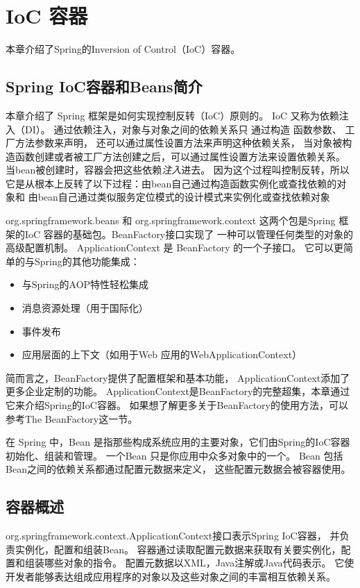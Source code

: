 
\chapter{IoC 容器}
本章介绍了Spring的Inversion of Control（IoC）容器。

\section{Spring IoC容器和Beans简介}
本章介绍了 Spring 框架是如何实现控制反转（IoC）原则的。
IoC 又称为依赖注入（DI）。
通过依赖注入，对象与对象之间的依赖关系只
通过构造
函数参数、
工厂方法参数来声明，
还可以通过属性设置方法来声明这种依赖关系，
当对象被构造函数创建或者被工厂方法创建之后，可以通过属性设置方法来设置依赖关系。
当bean被创建时，容器会把这些依赖\textit{注入}进去。
因为这个过程叫控制反转，所以它是从根本上反转了以下过程：由bean自己通过构造函数实例化或查找依赖的对象和
由bean自己通过类似服务定位模式的设计模式来实例化或查找依赖对象

org.springframework.beans 和 org.springframework.context 
这两个包是Spring 框架的IoC 容器的基础包。BeanFactory接口实现了
一种可以管理任何类型的对象的高级配置机制。
ApplicationContext 是 BeanFactory 的一个子接口。
它可以更简单的与Spring的其他功能集成：

\begin{itemize}
    \item 与Spring的AOP特性轻松集成
    \item 消息资源处理（用于国际化）
    \item 事件发布
    \item 应用层面的上下文（如用于Web 应用的WebApplicationContext）
\end{itemize}

简而言之，BeanFactory提供了配置框架和基本功能，
ApplicationContext添加了更多企业定制的功能。
ApplicationContext是BeanFactory的完整超集，本章通过它来介绍Spring的IoC容器。
如果想了解更多关于BeanFactory的使用方法，可以参考The BeanFactory这一节。

在 Spring 中，Bean 是指那些构成系统应用的主要对象，它们由Spring的IoC容器初始化、组装和管理。
一个Bean 只是你应用中众多对象中的一个。
Bean 包括 Bean之间的依赖关系都通过配置元数据来定义，
这些配置元数据会被容器使用。

\section{容器概述}
org.springframework.context.ApplicationContext接口表示Spring IoC容器，
并负责实例化，配置和组装Bean。 
容器通过读取配置元数据来获取有关要实例化，配置和组装哪些对象的指令。 
配置元数据以XML，Java注解或Java代码表示。 
它使开发者能够表达组成应用程序的对象以及这些对象之间的丰富相互依赖关系。

